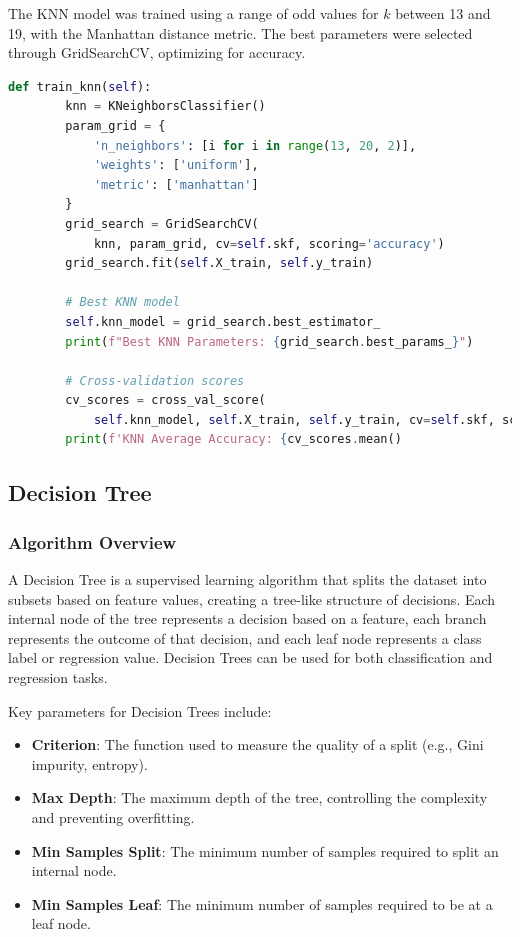 \documentclass[a4paper,11pt]{article}
\begin{document}
The KNN model was trained using a range of odd values for \(k\) between 13 and 19, with the Manhattan distance metric. The best parameters were selected through GridSearchCV, optimizing for accuracy.

\begin{lstlisting}[language=Python]
    def train_knn(self):
        knn = KNeighborsClassifier()
        param_grid = {
            'n_neighbors': [i for i in range(13, 20, 2)],
            'weights': ['uniform'],
            'metric': ['manhattan']
        }
        grid_search = GridSearchCV(
            knn, param_grid, cv=self.skf, scoring='accuracy')
        grid_search.fit(self.X_train, self.y_train)

        # Best KNN model
        self.knn_model = grid_search.best_estimator_
        print(f"Best KNN Parameters: {grid_search.best_params_}")

        # Cross-validation scores
        cv_scores = cross_val_score(
            self.knn_model, self.X_train, self.y_train, cv=self.skf, scoring='accuracy')
        print(f'KNN Average Accuracy: {cv_scores.mean()
\end{lstlisting}

\subsection{Decision Tree}

\subsubsection{Algorithm Overview}

A Decision Tree is a supervised learning algorithm that splits the dataset into subsets based on feature values, creating a tree-like structure of decisions. Each internal node of the tree represents a decision based on a feature, each branch represents the outcome of that decision, and each leaf node represents a class label or regression value. Decision Trees can be used for both classification and regression tasks.

Key parameters for Decision Trees include:
\begin{itemize}
    \item \textbf{Criterion}: The function used to measure the quality of a split (e.g., Gini impurity, entropy).
    \item \textbf{Max Depth}: The maximum depth of the tree, controlling the complexity and preventing overfitting.
    \item \textbf{Min Samples Split}: The minimum number of samples required to split an internal node.
    \item \textbf{Min Samples Leaf}: The minimum number of samples required to be at a leaf node.
\end{itemize}
\end{document}
